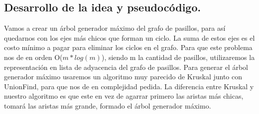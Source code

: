 
%



\subsection{Desarrollo de la idea y pseudocódigo.}

\vspace*{0.3cm}


Vamos a crear un árbol generador máximo del grafo de pasillos, para así quedarnos con los ejes más chicos que forman un ciclo. La suma de estos ejes es el costo mínimo a pagar para eliminar los ciclos en el grafo.
Para que este problema nos de en orden O($m*log(m)$), siendo m la cantidad de pasillos, utilizaremos la representación en lista de adyacencia del grafo de pasillos. Para generar el árbol generador máximo usaremos un algoritmo muy parecido de Kruskal junto con UnionFind, para que nos de en complejidad pedida. La diferencia entre Kruskal y nuestro algoritmo es que este en vez de agarrar primero las aristas más chicas, tomará las aristas más grande, formado el árbol generador máximo.

